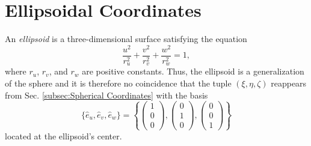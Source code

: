 \documentclass[11pt,dvipsnames]{thesis}
\begin{document}
\section{Ellipsoidal Coordinates}
An \textit{ellipsoid} is a three-dimensional surface satisfying the equation
\begin{equation}
\frac{u^2}{r_u^2} + \frac{v^2}{r_v^2} + \frac{w^2}{r_w^2} = 1, \label{eq:ellipsoideq}
\end{equation}
where $r_u$, $r_v$, and $r_w$ are positive constants. Thus, the ellipsoid is a generalization of the sphere and it is therefore no coincidence that the tuple $(\xi, \eta, \zeta)$ reappears from Sec. \ref{subsec:Spherical Coordinates} with the basis
\begin{equation}
\{\hat{e}_u, \hat{e}_v, \hat{e}_w\} = \left\{\begin{pmatrix}1 \\ 0 \\ 0\end{pmatrix}, \begin{pmatrix}0 \\ 1 \\ 0\end{pmatrix}, \begin{pmatrix}0 \\ 0 \\ 1\end{pmatrix}\right\}
\end{equation}
located at the ellipsoid's center.
\end{document}
